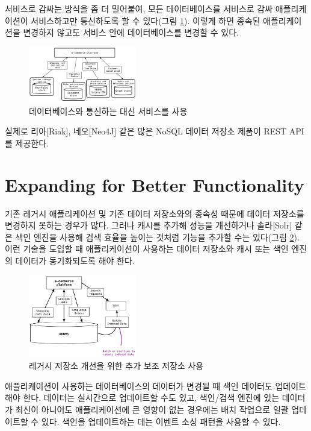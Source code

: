 \documentclass[twocolumn]{article}
\begin{document}
서비스로 감싸는 방식을 좀 더 밀어붙여, 모든 데이터베이스를 서비스로 감싸 애플리케이션이 서비스하고만 통신하도록 할 수 있다(그림 \ref{fig05}). 이렇게 하면 종속된 애플리케이션을 변경하지 않고도 서비스 안에 데이터베이스를 변경할 수 있다.

\begin{figure}[htb]
        \centering
        \includegraphics[width=0.42\textwidth]{services}
        \caption{데이터베이스와 통신하는 대신 서비스를 사용}
        \label{fig05}
\end{figure}

실제로 리아[Riak], 네오[Neo4J] 같은 많은 NoSQL 데이터 저장소 제품이 REST API를 제공한다.

\section{Expanding for Better Functionality}
기존 레거시 애플리케이션 및 기존 데이터 저장소와의 종속성 때문에 데이터 저장소를 변경하지 못하는 경우가 많다. 그러나 캐시를 추가해 성능을 개선하거나 솔라[Solr] 같은 색인 엔진을 사용해 검색 효율을 높이는 것처럼 기능을 추가할 수는 있다(그림 \ref{fig06}). 이런 기술을 도입할 때 애플리케이션이 사용하는 데이터 저장소와 캐시 또는 색인 엔진의 데이터가 동기화되도록 해야 한다.

\begin{figure}[htb]
        \centering
        \includegraphics[width=0.42\textwidth]{storage}
        \caption{레거시 저장소 개선을 위한 추가 보조 저장소 사용}
        \label{fig06}
\end{figure}

애플리케이션이 사용하는 데이터베이스의 데이터가 변경될 때 색인 데이터도 업데이트해야 한다. 데이터는 실시간으로 업데이트할 수도 있고, 색인/검색 엔진에 있는 데이터가 최신이 아니어도 애플리케이션에 큰 영향이 없는 경우에는 배치 작업으로 일괄 업데이트할 수 있다. 색인을 업데이트하는 데는 이벤트 소싱 패턴을 사용할 수 있다.
\end{document}
